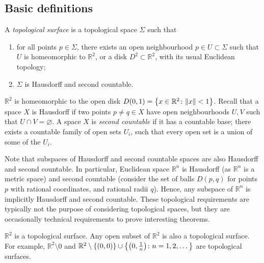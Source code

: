 \subsection{Basic definitions}
\begin{definition}
	A \textit{topological surface} is a topological space \( \Sigma \) such that
	\begin{enumerate}
		\item for all points \( p \in \Sigma \), there exists an open neighbourhood \( p \in U \subset \Sigma \) such that \( U \) is homeomorphic to \( \mathbb R^2 \), or a disk \( D^2 \subset \mathbb R^2 \), with its usual Euclidean topology;
		\item \( \Sigma \) is Hausdorff and second countable.
	\end{enumerate}
\end{definition}
\begin{remark}
	\( \mathbb R^2 \) is homeomorphic to the open disk \( D(0,1) = \qty{ x \in \mathbb R^2 \colon \norm{x} < 1 } \).
	Recall that a space \( X \) is Hausdorff if two points \( p \neq q \in X \) have open neighbourhoods \( U, V \) such that \( U \cap V = \varnothing \).
	A space \( X \) is \textit{second countable} if it has a countable base; there exists a countable family of open sets \( U_i \), such that every open set is a union of some of the \( U_i \).

	Note that subspaces of Hausdorff and second countable spaces are also Hausdorff and second countable.
	In particular, Euclidean space \( \mathbb R^n \) is Hausdorff (as \( \mathbb R^n \) is a metric space) and second countable (consider the set of balls \( D(p,q) \) for points \( p \) with rational coordinates, and rational radii \( q \)).
	Hence, any subspace of \( \mathbb R^n \) is implicitly Hausdorff and second countable.
	These topological requirements are typically not the purpose of considering topological spaces, but they are occasionally technical requirements to prove interesting theorems.
\end{remark}
\begin{example}
	\( \mathbb R^2 \) is a topological surface.
	Any open subset of \( \mathbb R^2 \) is also a topological surface.
	For example, \( \mathbb R^2 \setminus \qty{0} \) and \( \mathbb R^2 \setminus \qty{(0,0)} \cup \qty{\qty(0, \frac{1}{n}) \colon n = 1, 2, \dots} \) are topological surfaces.
\end{example}
